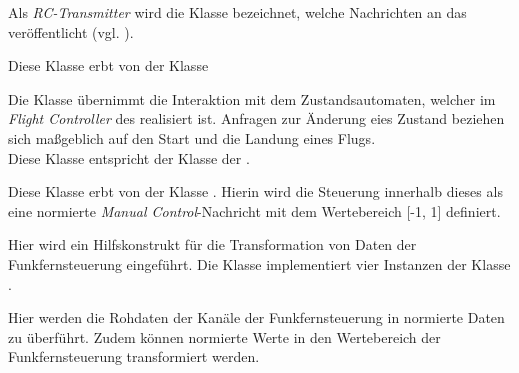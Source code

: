 Als \textit{RC-Transmitter} wird die Klasse bezeichnet, welche Nachrichten an das  veröffentlicht (vgl. ).

Diese Klasse erbt von der Klasse 


Die Klasse  übernimmt die Interaktion mit dem Zustandsautomaten, welcher im \textit{Flight Controller} des \Quad[s] realisiert ist.
Anfragen zur Änderung eies Zustand beziehen sich maßgeblich auf den Start und die Landung eines Flugs.
\\Diese Klasse entspricht der Klasse  der \Ar.


Diese Klasse erbt von der Klasse . Hierin wird die Steuerung innerhalb dieses \Pack[s] als eine normierte \textit{Manual Control}-Nachricht mit dem Wertebereich [-1, 1] definiert.


Hier wird ein Hilfskonstrukt für die Transformation von Daten der Funkfernsteuerung eingeführt. Die Klasse implementiert vier Instanzen der Klasse .


Hier werden die Rohdaten der Kanäle der Funkfernsteuerung in normierte Daten zu überführt. Zudem können normierte Werte in den Wertebereich der Funkfernsteuerung transformiert werden.

